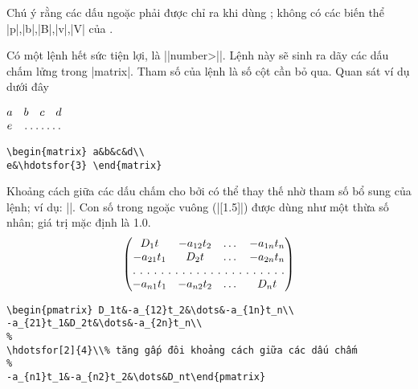 \medskip
Chú ý rằng các dấu ngoặc phải được chỉ ra khi dùng ;
không có các biến thể |p|,|b|,|B|,|v|,|V| của .

\medskip
Có một lệnh hết sức tiện lợi, là |{|\<number>|}|.
Lệnh này sẽ sinh ra dãy các dấu chấm lửng trong |matrix|. Tham số
của lệnh là số cột cần bỏ qua. Quan sát ví dụ dưới đây

\medskip
\begin{center}
\begin{minipage}{.3\columnwidth}
\noindent$\begin{matrix} a&b&c&d\\
e&\hdotsfor{3} \end{matrix}$
\end{minipage}%
\qquad
\begin{minipage}{.45\columnwidth}
\begin{verbatim}
\begin{matrix} a&b&c&d\\
e&\hdotsfor{3} \end{matrix}
\end{verbatim}
\end{minipage}%
\end{center}

\medskip
Khoảng cách giữa các dấu chấm cho bởi  có thể thay thế nhờ
tham số bổ sung của lệnh; ví dụ: ||. Con số trong ngoặc
vuông (|[1.5]|) được dùng như một thừa số nhân; giá trị mặc định là 1.0.
\begin{equation}\label{eq:D}
\begin{pmatrix} D_1t&-a_{12}t_2&\dots&-a_{1n}t_n\\
-a_{21}t_1&D_2t&\dots&-a_{2n}t_n\\
\hdotsfor[2]{4}\\
-a_{n1}t_1&-a_{n2}t_2&\dots&D_nt\end{pmatrix}
\end{equation}

\begin{verbatim}
\begin{pmatrix} D_1t&-a_{12}t_2&\dots&-a_{1n}t_n\\
-a_{21}t_1&D_2t&\dots&-a_{2n}t_n\\
%
\hdotsfor[2]{4}\\% tăng gấp đôi khoảng cách giữa các dấu chấm
%
-a_{n1}t_1&-a_{n2}t_2&\dots&D_nt\end{pmatrix}
\end{verbatim}

